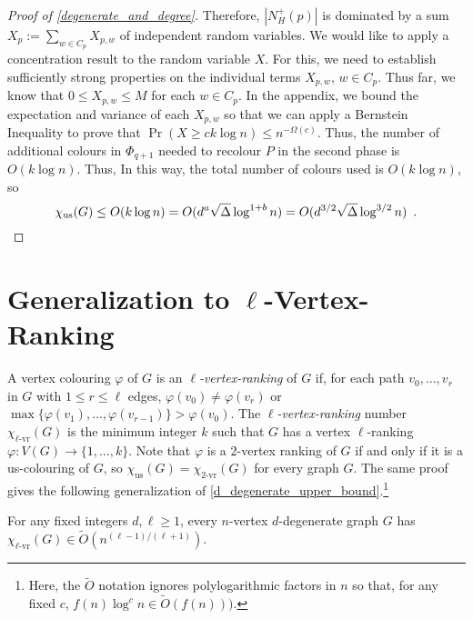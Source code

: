 \documentclass{patmorin}
\newcommand{\defin}[1]{\emph{\color{brightmaroon}#1}}
\newcommand{\rn}[1]{\chi_{\operatorname{#1-vr}}}
\newcommand{\trn}{\chi_{\mathrm{us}}}
\newcommand{\lrn}{\rn{\ell}}
\begin{document}
\begin{proof}[Proof of \cref{degenerate_and_degree}]
  Therefore, $|N_H^+(p)|$ is dominated by a sum $X_p:=\sum_{w\in C_p} X_{p,w}$ of independent random variables.  We would like to apply a concentration result to the random variable $X$.  For this, we need to  establish sufficiently strong properties on the individual terms $X_{p,w}$, $w\in C_p$.  Thus far, we know that $0\le X_{p,w}\le M$ for each $w\in C_p$. In the appendix, we bound the expectation and variance of each $X_{p,w}$ so that we can apply a Bernstein Inequality to prove that $\Pr(X\ge ck\log n)\le n^{-\Omega(c)}$.  Thus, the number of additional colours in $\Phi_{q+1}$ needed to recolour $P$ in the second phase is $O(k\log n)$.  Thus, In this way, the total number of colours used is $O(k\log n)$, so
  \[
    \trn(G) \le O(k \log n) = O(d^a\sqrt{\Delta}\log^{1+b} n) = O(d^{3/2}\sqrt{\Delta}\log^{3/2} n) \enspace . \qedhere
  \]
\end{proof}

\section{Generalization to $\ell$-Vertex-Ranking}

A vertex colouring $\varphi$ of $G$ is an \defin{$\ell$-vertex-ranking} of $G$ if, for each path $v_0,\ldots,v_r$ in $G$ with $1\le r\le\ell$ edges, $\varphi(v_0)\neq \varphi(v_r)$ or $\max\{\varphi(v_1),\ldots,\varphi(v_{r-1})\}>\varphi(v_0)$.  The \defin{$\ell$-vertex-ranking} number $\lrn(G)$ is the minimum integer $k$ such that $G$ has a vertex $\ell$-ranking $\varphi:V(G)\to\{1,\ldots,k\}$.  Note that $\varphi$ is a $2$-vertex ranking of $G$ if and only if it is a us-colouring of $G$, so $\trn(G)=\rn{2}(G)$ for every graph $G$.  The same proof gives the following generalization of \cref{d_degenerate_upper_bound}.\footnote{Here, the $\tilde{O}$ notation ignores polylogarithmic factors in $n$ so that, for any fixed $c$,  $f(n)\log^c n\in \tilde{O}(f(n)))$.}

\begin{thm}
  For any fixed integers $d,\ell\ge 1$, every $n$-vertex $d$-degenerate graph $G$ has $\lrn(G) \in \tilde{O}(n^{(\ell-1)/(\ell+1)})$.
\end{thm}
\end{document}
